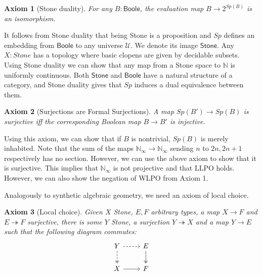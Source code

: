 \documentclass[letterpaper]{../../util/easychair}
\newtheorem{axiom}{Axiom}
\newcommand{\N}{\mathbb{N}}
\newcommand{\Boole}{\mathsf{Boole}}
\newcommand{\Stone}{\mathsf{Stone}}
\newcommand{\Noo}{\N_{\infty}}
\begin{document}
\begin{axiom}[Stone duality]
  For any 
  $B:\Boole$, 
  the evaluation map $B \to 2^{Sp(B)}$ is an isomorphism. 
\end{axiom}
It follows from Stone duality that being Stone is a proposition and $Sp$ defines an embedding from $\Boole$ 
to any universe $\mathcal U$. We denote its image $\Stone$. 
%
%
Any $X:Stone$ has a topology where basic clopens are given by decidable subsets. 
Using Stone duality we can show that any map from a Stone space to $\mathbb N$ is uniformly continuous. 
Both $\Stone$ and $\Boole$ have a natural structure of a category, and 
Stone duality gives that $Sp$ induces a dual equivalence between them. 

\begin{axiom}[Surjections are Formal Surjections]
  A map $Sp(B')\to Sp(B)$ is surjective iff the corresponding Boolean map $B \to B'$ is injective.
\end{axiom} 
Using this axiom, we can show that if $B$ is nontrivial, $Sp(B)$ is merely inhabited.
%
%
Note that the sum of the maps $\Noo \to \Noo$ sending $n$ to $2n,2n+1$ respectively has no section. 
However, we can use the above axiom to show that it is surjective. 
This implies that $\Noo$ is not projective and that LLPO holds. 
However, we can also show the negation of WLPO from Axiom 1.  

\medskip

Analogously to synthetic algebraic geometry, we need an axiom of local choice. 
\begin{axiom}[Local choice]
  Given $X$ Stone, $E,F$ arbitrary types, a map $X \to F$ and $E\twoheadrightarrow F$ surjective, 
  there is some $Y$ Stone,
    a surjection $Y \twoheadrightarrow X$ and a map $Y\to E$ such that the following diagram commutes:
    \begin{equation*}\begin{tikzcd}
      Y \arrow [d, two heads,dashed] \arrow [r,dashed] & E \arrow[d,""',two heads]\\
      X \arrow[r] & F
    \end{tikzcd}\end{equation*}  
\end{axiom} 
\end{document}
